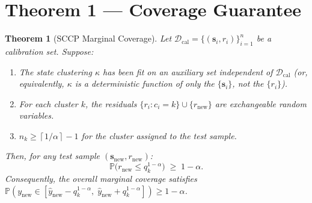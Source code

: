 \documentclass[11pt]{article}
\newtheorem{theorem}{Theorem}[section]
\newcommand{\Pbb}{\mathbb{P}}
\newcommand{\cD}{\mathcal{D}}
\newcommand{\ceil}[1]{\left\lceil #1 \right\rceil}
\begin{document}
\section{Theorem 1 — Coverage Guarantee}

\begin{theorem}[SCCP Marginal Coverage]\label{thm:coverage}
Let $\cD_{\text{cal}} = \{(\mathbf{s}_i, r_i)\}_{i=1}^{n}$ be a calibration set. Suppose:
\begin{enumerate}
    \item[(A1)] The state clustering $\kappa$ has been fit on an auxiliary set independent of $\cD_{\text{cal}}$ (or, equivalently, $\kappa$ is a deterministic function of only the $\{\mathbf{s}_i\}$, not the $\{r_i\}$).
    \item[(A2)] For each cluster $k$, the residuals $\{r_i \colon c_i = k\} \cup \{r_{\text{new}}\}$ are exchangeable random variables.
    \item[(A3)] $n_k \geq \ceil{1/\alpha} - 1$ for the cluster assigned to the test sample.
\end{enumerate}
Then, for any test sample $(\mathbf{s}_{\text{new}}, r_{\text{new}})$:
\[
\Pbb\big(r_{\text{new}} \leq q_{k}^{1-\alpha}\big) \;\geq\; 1 - \alpha.
\]
Consequently, the overall marginal coverage satisfies $\Pbb(y_{\text{new}} \in [\hat{y}_{\text{new}} - q_k^{1-\alpha},\; \hat{y}_{\text{new}} + q_k^{1-\alpha}]) \geq 1-\alpha$.
\end{theorem}
\end{document}
